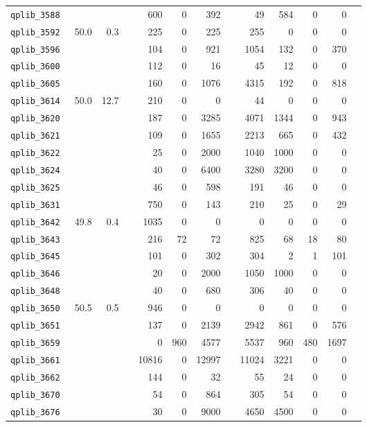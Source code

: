 {\begin{longtable}{lrrrrrrrrrrrr}
{\tt 	qplib\_3588	}	&		&		&	&	600	&	0	&	392	&	&	49	&	584	&	0	&	0	\\
{\tt 	qplib\_3592	}	&	50.0	&	0.3	&	&	225	&	0	&	225	&	&	255	&	0	&	0	&	0	\\
{\tt 	qplib\_3596	}	&		&		&	&	104	&	0	&	921	&	&	1054	&	132	&	0	&	370	\\
{\tt 	qplib\_3600	}	&		&		&	&	112	&	0	&	16	&	&	45	&	12	&	0	&	0	\\
{\tt 	qplib\_3605	}	&		&		&	&	160	&	0	&	1076	&	&	4315	&	192	&	0	&	818	\\
{\tt 	qplib\_3614	}	&	50.0	&	12.7	&	&	210	&	0	&	0	&	&	44	&	0	&	0	&	0	\\
{\tt 	qplib\_3620	}	&		&		&	&	187	&	0	&	3285	&	&	4071	&	1344	&	0	&	943	\\
{\tt 	qplib\_3621	}	&		&		&	&	109	&	0	&	1655	&	&	2213	&	665	&	0	&	432	\\
{\tt 	qplib\_3622	}	&		&		&	&	25	&	0	&	2000	&	&	1040	&	1000	&	0	&	0	\\
{\tt 	qplib\_3624	}	&		&		&	&	40	&	0	&	6400	&	&	3280	&	3200	&	0	&	0	\\
{\tt 	qplib\_3625	}	&		&		&	&	46	&	0	&	598	&	&	191	&	46	&	0	&	0	\\
{\tt 	qplib\_3631	}	&		&		&	&	750	&	0	&	143	&	&	210	&	25	&	0	&	29	\\
{\tt 	qplib\_3642	}	&	49.8	&	0.4	&	&	1035	&	0	&	0	&	&	0	&	0	&	0	&	0	\\
{\tt 	qplib\_3643	}	&		&		&	&	216	&	72	&	72	&	&	825	&	68	&	18	&	80	\\
{\tt 	qplib\_3645	}	&		&		&	&	101	&	0	&	302	&	&	304	&	2	&	1	&	101	\\
{\tt 	qplib\_3646	}	&		&		&	&	20	&	0	&	2000	&	&	1050	&	1000	&	0	&	0	\\
{\tt 	qplib\_3648	}	&		&		&	&	40	&	0	&	680	&	&	306	&	40	&	0	&	0	\\
{\tt 	qplib\_3650	}	&	50.5	&	0.5	&	&	946	&	0	&	0	&	&	0	&	0	&	0	&	0	\\
{\tt 	qplib\_3651	}	&		&		&	&	137	&	0	&	2139	&	&	2942	&	861	&	0	&	576	\\
{\tt 	qplib\_3659	}	&		&		&	&	0	&	960	&	4577	&	&	5537	&	960	&	480	&	1697	\\
{\tt 	qplib\_3661	}	&		&		&	&	10816	&	0	&	12997	&	&	11024	&	3221	&	0	&	0	\\
{\tt 	qplib\_3662	}	&		&		&	&	144	&	0	&	32	&	&	55	&	24	&	0	&	0	\\
{\tt 	qplib\_3670	}	&		&		&	&	54	&	0	&	864	&	&	305	&	54	&	0	&	0	\\
{\tt 	qplib\_3676	}	&		&		&	&	30	&	0	&	9000	&	&	4650	&	4500	&	0	&	0	\\

\end{longtable}}
